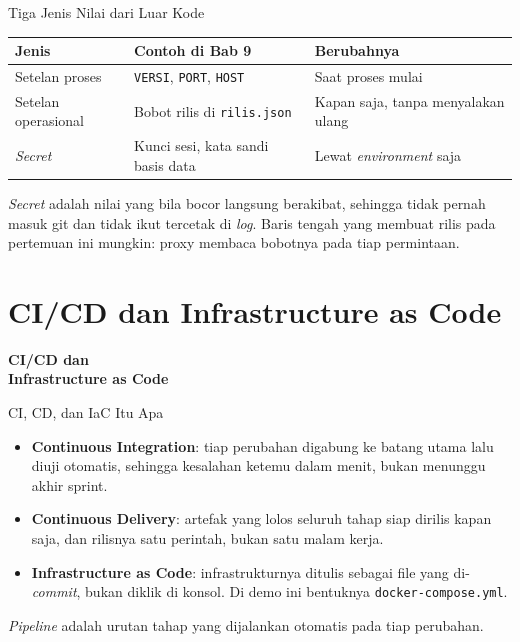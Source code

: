 \documentclass[aspectratio=169, table, 12pt]{beamer}
\begin{document}
\begin{frame}{{\Large Tiga Jenis Nilai dari Luar Kode}}
  \vspace{6pt}
  \centering
  {\footnotesize
  \begin{tabularx}{\textwidth}{lYl}
    \hline
    \textbf{Jenis} & \textbf{Contoh di Bab 9} & \textbf{Berubahnya} \\
    \hline
    Setelan proses & \texttt{VERSI}, \texttt{PORT}, \texttt{HOST} & Saat proses mulai \\
    \hline
    Setelan operasional & Bobot rilis di \texttt{rilis.json} & Kapan saja, tanpa menyalakan ulang \\
    \hline
    \textit{Secret} & Kunci sesi, kata sandi basis data & Lewat \textit{environment} saja \\
    \hline
  \end{tabularx}}

  \vspace{8pt}
  {\small \textit{Secret} adalah nilai yang bila bocor langsung berakibat,
  sehingga tidak pernah masuk git dan tidak ikut tercetak di \textit{log}.
  Baris tengah yang membuat rilis pada pertemuan ini mungkin: proxy membaca
  bobotnya pada tiap permintaan.}
\end{frame}

\section{CI/CD dan Infrastructure as Code}

\begin{frame}{\hfill}
  \centering
  \Huge{\textbf{CI/CD dan\\Infrastructure as Code}}
\end{frame}

\begin{frame}{{\Large CI, CD, dan IaC Itu Apa}}
  \vspace{10pt}
  \begin{itemize}
    \item \textbf{Continuous Integration}: tiap perubahan digabung ke batang
          utama lalu diuji otomatis, sehingga kesalahan ketemu dalam menit,
          bukan menunggu akhir sprint.
    \item \textbf{Continuous Delivery}: artefak yang lolos seluruh tahap
          siap dirilis kapan saja, dan rilisnya satu perintah, bukan satu
          malam kerja.
    \item \textbf{Infrastructure as Code}: infrastrukturnya ditulis sebagai
          file yang di-\textit{commit}, bukan diklik di konsol. Di demo ini
          bentuknya \texttt{docker-compose.yml}.
  \end{itemize}
  \vspace{8pt}
  {\small \textit{Pipeline} adalah urutan tahap yang dijalankan otomatis
  pada tiap perubahan.}
\end{frame}
\end{document}
